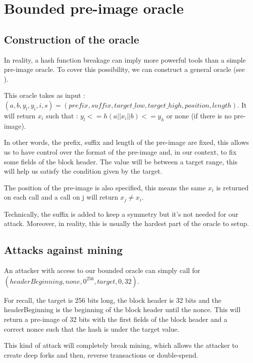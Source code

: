 \section{Bounded pre-image oracle}


  \subsection{Construction of the oracle}

In reality, a hash function breakage can imply more powerful tools than a simple pre-image oracle. To cover this possibility, we can construct a general oracle (see \cite{broken_crypto_primitives}). \newline

This oracle takes as input : $(a, b, y_l, y_i, i, s) = (prefix, suffix, target\_low, target\_high, position, length)$. It will return $x_i$ such that : $y_l <= h(a || x_i || b) <= y_h$ or none (if there is no pre-image). \newline

In other words, the prefix, suffix and length of the pre-image are fixed, this allows us to have control over the format of the pre-image and, in our context, to fix some fields of the block header. The value will be between a target range, this will help us satisfy the condition given by the target.

The position of the pre-image is also specified, this means the same $x_i$ is returned on each call and a call on j will return $x_j \neq x_i$. \newline

Technically, the suffix is added to keep a symmetry but it's not needed for our attack. Moreover, in reality, this is usually the hardest part of the oracle to setup.

  \subsection{Attacks against mining}


An attacker with access to our bounded oracle can simply call for $(headerBeginning, none, 0^{256}, target, 0, 32)$. \newline

For recall, the target is 256 bits long, the block header is 32 bits and the headerBeginning is the beginning of the block header until the nonce. This will return a pre-image of 32 bits with the first fields of the block header and a correct nonce such that the hash is under the target value. \newline

This kind of attack will completely break mining, which allows the attacker to create deep forks and then, reverse transactions or double-spend.
